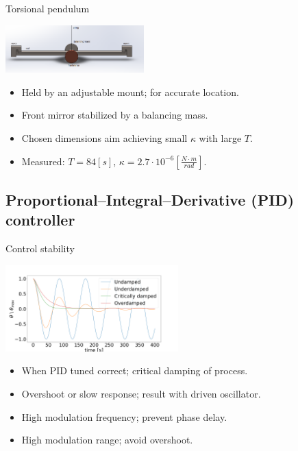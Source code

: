 \documentclass{beamer}
\begin{document}
\begin{frame}{Torsional pendulum}
	\begin{center}		
		\includegraphics[width=0.4\textwidth,keepaspectratio]{pendulum_front_names.png}
	\end{center}
	\begin{itemize}
		\item Held by an adjustable mount; for accurate location. 
		\item Front mirror stabilized by a balancing mass.		
		\item Chosen dimensions aim achieving small $\kappa$ with large $T$.
		\item Measured: $T = 84[s]$, $\kappa = 2.7\cdot10^{-6}[\frac{N\cdot m}{rad}]$.
	\end{itemize}
	
\end{frame}


\subsection{Proportional–Integral–Derivative (PID) controller}


\begin{frame}{Control stability}
	\begin{center}		
		\includegraphics[width=0.5\textwidth,keepaspectratio]{damp.png}
	\end{center}
	\begin{itemize}		
		\item When PID tuned correct; critical damping of process.

		\item Overshoot or slow response; result with driven oscillator.
		\item High modulation frequency; prevent phase delay.
		\item High modulation range; avoid overshoot.
		
		
	\end{itemize}
\end{frame}
\end{document}
